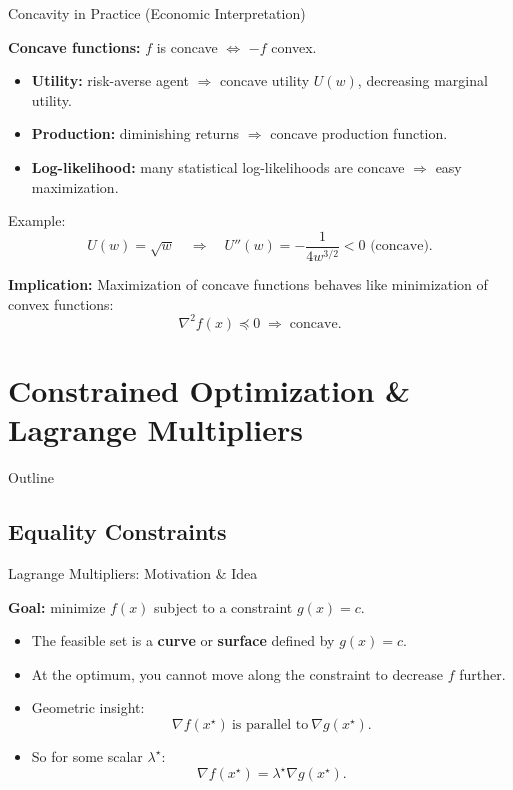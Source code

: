 \documentclass[aspectratio=169]{beamer}
\begin{document}
\begin{frame}{Concavity in Practice (Economic Interpretation)}

\textbf{Concave functions:} $f$ is concave $\iff$ $-f$ convex.

\begin{itemize}
  \item \textbf{Utility:} risk-averse agent $\Rightarrow$ concave utility $U(w)$, decreasing marginal utility.
  \item \textbf{Production:} diminishing returns $\Rightarrow$ concave production function.
  \item \textbf{Log-likelihood:} many statistical log-likelihoods are concave $\Rightarrow$ easy maximization.
\end{itemize}

\textcolor{BootcampBlueDark}{Example:}
\[
U(w)=\sqrt{w}\quad\Rightarrow\quad
U''(w)=-\frac{1}{4w^{3/2}}<0 \text{ (concave)}.
\]

\textbf{Implication:}
Maximization of concave functions behaves like minimization of convex functions:
\[
\nabla^2 f(x)\preceq 0 \;\Rightarrow\; \text{concave}.
\]

\end{frame}

\section{Constrained Optimization \& Lagrange Multipliers}

\begin{frame}{Outline}
\end{frame}

\subsection{Equality Constraints}
\begin{frame}{Lagrange Multipliers: Motivation \& Idea}

\textbf{Goal:} minimize \(f(x)\) subject to a constraint \(g(x)=c\).
\pause
\begin{itemize}
  \item The feasible set is a \textbf{curve} or \textbf{surface} defined by \(g(x)=c\).
  \item At the optimum, you cannot move along the constraint to decrease \(f\) further.
  \item Geometric insight:
        \[
        \nabla f(x^\star)\ \text{is parallel to}\ \nabla g(x^\star).
        \]
  \item So for some scalar \(\lambda^\star\):
        \[
        \nabla f(x^\star) = \lambda^\star \nabla g(x^\star).
        \]
\end{itemize}

\end{frame}
\end{document}

